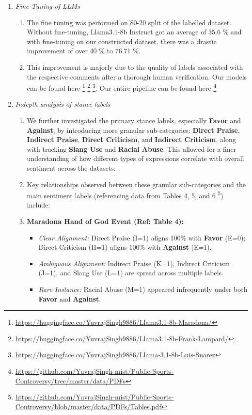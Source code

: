 \documentclass[sigconf, review]{acmart}
\begin{document}
\begin{enumerate}
      \item \textit{Fine Tuning of LLMs}
    \begin{enumerate}
        \item The fine tuning was performed on 80-20 split of the labelled dataset. Without fine-tuning, Llama3.1-8b Instruct got an average of 35.6 \% and with fine-tuning on our constructed dataset, there was a drastic improvement of over 40 \% to 76.71 \%.
        \item This improvement is majorly due to the quality of labels associated with the respective comments after a thorough human verification. Our models can be found here \footnote{\url{https://huggingface.co/YuvrajSingh9886/Llama3.1-8b-Maradona/}} \footnote{\url{https://huggingface.co/YuvrajSingh9886/Llama3.1-8b-Frank-Lampard/}} \footnote{\url{https://huggingface.co/YuvrajSingh9886/Llama-3.1-8b-Luis-Suarez}}. Our entire pipeline can be found here \footnote{\url{https://github.com/YuvrajSingh-mist/Public-Sports-Controversy/tree/master/data/PDFs}}
       
    \end{enumerate}


\item \textit{Indepth analysis of stance labels}
        \begin{enumerate}
            \item We further investigated the primary stance labels, especially \textbf{Favor} and \textbf{Against}, by introducing more granular sub-categories: \textbf{Direct Praise}, \textbf{Indirect Praise}, \textbf{Direct Criticism}, and \textbf{Indirect Criticism}, along with tracking \textbf{Slang Use} and \textbf{Racial Abuse}. This allowed for a finer understanding of how different types of expressions correlate with overall sentiment across the datasets.

            \item Key relationships observed between these granular sub-categories and the main sentiment labels (referencing data from Tables 4, 5, and 6 \footnote{\url{https://github.com/YuvrajSingh-mist/Public-Sports-Controversy/blob/master/data/PDFs/Tables.pdf}}) include:
                    \item \textbf{Maradona Hand of God Event (Ref: Table 4):}
                        \begin{itemize}
                            \item \textit{Clear Alignment:} Direct Praise (I=1) aligns 100\% with \textbf{Favor} (E=0); Direct Criticism (H=1) aligns 100\% with \textbf{Against} (E=1).
                            \item \textit{Ambiguous Alignment:} Indirect Praise (K=1), Indirect Criticism (J=1), and Slang Use (L=1) are spread across multiple labels.
                            \item \textit{Rare Instance:} Racial Abuse (M=1) appeared infrequently under both \textbf{Favor} and \textbf{Against}.
                        \end{itemize}


\end{enumerate}
\end{enumerate}
\end{document}
